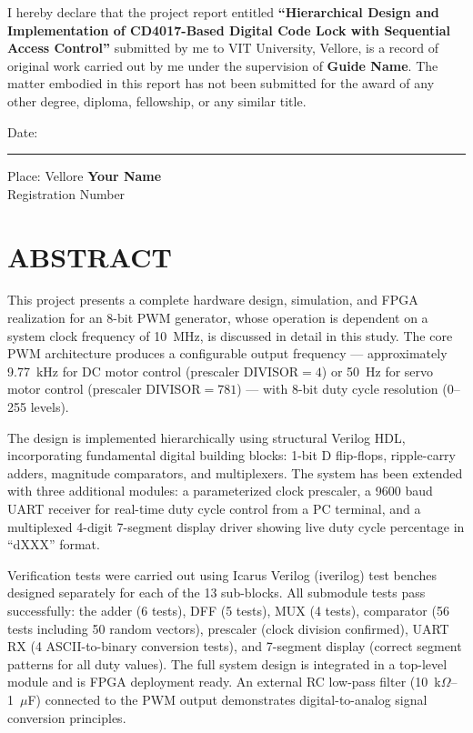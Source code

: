 \documentclass[12pt,a4paper]{article}
\begin{document}
I hereby declare that the project report entitled \textbf{``Hierarchical Design and Implementation of CD4017-Based Digital Code Lock with Sequential Access Control''} submitted by me to VIT University, Vellore, is a record of original work carried out by me under the supervision of \textbf{Guide Name}. The matter embodied in this report has not been submitted for the award of any other degree, diploma, fellowship, or any similar title.

\vspace{2cm}
\noindent Date: \rule{3cm}{0.4pt} \hfill Place: Vellore
\vspace{1.5cm}
\noindent\textbf{Your Name}\\Registration Number



\section*{ABSTRACT}
This project presents a complete hardware design, simulation, and FPGA realization for an 8-bit PWM generator, whose operation is dependent on a system clock frequency of 10~MHz, is discussed in detail in this study. The core PWM architecture produces a configurable output frequency --- approximately 9.77~kHz for DC motor control (prescaler DIVISOR${}=4$) or 50~Hz for servo motor control (prescaler DIVISOR${}=781$) --- with 8-bit duty cycle resolution (0--255 levels).

The design is implemented hierarchically using structural Verilog HDL, incorporating fundamental digital building blocks: 1-bit D flip-flops, ripple-carry adders, magnitude comparators, and multiplexers. The system has been extended with three additional modules: a parameterized clock prescaler, a 9600 baud UART receiver for real-time duty cycle control from a PC terminal, and a multiplexed 4-digit 7-segment display driver showing live duty cycle percentage in ``dXXX'' format.

Verification tests were carried out using Icarus Verilog (iverilog) test benches designed separately for each of the 13 sub-blocks. All submodule tests pass successfully: the adder (6 tests), DFF (5 tests), MUX (4 tests), comparator (56 tests including 50 random vectors), prescaler (clock division confirmed), UART RX (4 ASCII-to-binary conversion tests), and 7-segment display (correct segment patterns for all duty values). The full system design is integrated in a top-level module and is FPGA deployment ready. An external RC low-pass filter (10~k$\Omega$--1~$\mu$F) connected to the PWM output demonstrates digital-to-analog signal conversion principles.
\end{document}
